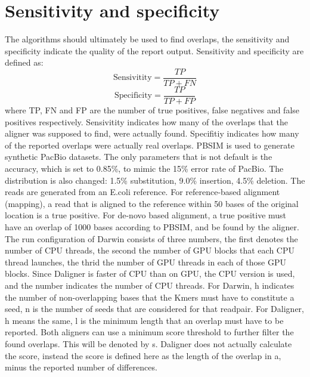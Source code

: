\documentclass[../main/thesis.tex]{subfiles}
\begin{document}
\section{Sensitivity and specificity}
The algorithms should ultimately be used to find overlaps, the sensitivity and specificity indicate the quality of the report output.
Sensitivity and specificity are defined as:
$$\text{Sensivitity} = \frac{TP}{TP + FN}$$
$$\text{Specificity} = \frac{TP}{TP + FP}$$
where TP, FN and FP are the number of true positives, false negatives and false positives respectively.
Sensivitity indicates how many of the overlaps that the aligner was supposed to find, were actually found.
Specifitiy indicates how many of the reported overlaps were actually real overlaps.
PBSIM \cite{PBSIM} is used to generate synthetic PacBio datasets.
The only parameters that is not default is the accuracy, which is set to 0.85\%, to mimic the 15\% error rate of PacBio.
The distribution is also changed: 1.5\% substitution, 9.0\% insertion, 4.5\% deletion.
The reads are generated from an E.coli reference.
For reference-based alignment (mapping), a read that is aligned to the reference within 50 bases of the original location is a true positive.
For de-novo based alignment, a true positive must have an overlap of 1000 bases according to PBSIM, and be found by the aligner.
The run configuration of Darwin consists of three numbers, the first denotes the number of CPU threads, the second the number of GPU blocks that each CPU thread launches, the thrid the number of GPU threads in each of those GPU blocks.
Since Daligner is faster of CPU than on GPU, the CPU version is used, and the number indicates the number of CPU threads.
For Darwin, h indicates the number of non-overlapping bases that the Kmers must have to constitute a seed, n is the number of seeds that are considered for that readpair.
For Daligner, h means the same, l is the minimum length that an overlap must have to be reported.
Both aligners can use a minimum score threshold to further filter the found overlaps.
This will be denoted by s.
Daligner does not actually calculate the score, instead the score is defined here as the length of the overlap in a, minus the reported number of differences.
\end{document}
